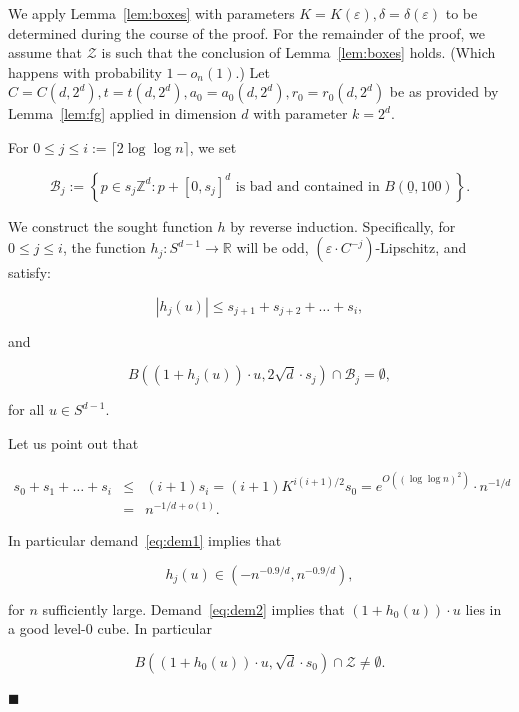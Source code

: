 \documentclass[11pt]{article}%
\newenvironment{proofof}[1]{\vspace{1ex}\noindent{\bf Proof of #1.}}{\hspace*{\fill}$\blacksquare$\vspace{1ex}}
\newcommand{\Bcal}[0]{\ensuremath{{\mathcal B}}}
\newcommand{\Zcal}[0]{\ensuremath{{\mathcal Z}}}
\newcommand{\eR}[0]{\ensuremath{ \mathbb R}}
\newcommand{\Zed}[0]{\ensuremath{ \mathbb Z}}
\newcommand{\eps}{\varepsilon}
\newcommand{\orig}{\underline{0}}
\begin{document}
\begin{proofof}{Lemma~\ref{lem:embed}}
We apply Lemma~\ref{lem:boxes} with parameters $K=K(\eps), \delta=\delta(\eps)$ to be determined 
during the course of the proof. 
For the remainder of the proof, we assume that $\Zcal$ is such that 
the conclusion of Lemma~\ref{lem:boxes} holds. (Which happens with probability $1-o_n(1)$.)
Let $C=C(d,2^d), t=t(d,2^d), a_0=a_0(d,2^d), r_0=r_0(d,2^d)$ be as provided by Lemma~\ref{lem:fg}
applied in dimension $d$ with parameter $k=2^d$.

For $0 \leq j \leq i := \lceil 2\log\log n \rceil$, we set

$$ \Bcal_j := 
\left\{  p \in s_j\Zed^d : \text{$p+[0,s_j]^d$ is bad and contained  in $B(\orig,100)$}\right\}. $$

We construct the sought function $h$ by reverse induction.
Specifically, for $0 \leq j \leq i$, the function $h_j : S^{d-1} \to \eR$ 
will be odd, $(\eps \cdot C^{-j})$-Lipschitz, and satisfy: 

\begin{equation}\label{eq:dem1} 
|h_j(u)| \leq s_{j+1} + s_{j+2} + \dots + s_i, 
\end{equation}

\noindent
and

\begin{equation}\label{eq:dem2} 
B\left( (1+h_j(u))\cdot u, 2\sqrt{d}\cdot s_j \right) \cap \Bcal_j = \emptyset, 
\end{equation}

\noindent
for all $u \in S^{d-1}$.

\noindent
Let us point out that

\begin{equation}\label{eq:sums} 
\begin{array}{rcl}
s_0 + s_1 + \dots + s_i 
& \leq & (i+1)s_i = (i+1) K^{i(i+1)/2} s_0 = e^{O\left( (\log\log n)^2 \right)} \cdot n^{-1/d} \\
& = & 
n^{-1/d+o(1)}. 
\end{array} 
\end{equation}

\noindent
In particular demand~\eqref{eq:dem1} implies that 

$$ h_j(u) \in \left(-n^{-0.9/d},n^{-0.9/d}\right), $$

\noindent
for $n$ sufficiently large. 
Demand~\eqref{eq:dem2} implies that $(1+h_0(u)) \cdot u$ lies in a 
good level-0 cube. In particular 

$$ B( (1+h_0(u))\cdot u, \sqrt{d} \cdot s_0 ) \cap \Zcal \neq \emptyset. $$


\end{proofof}
\end{document}

